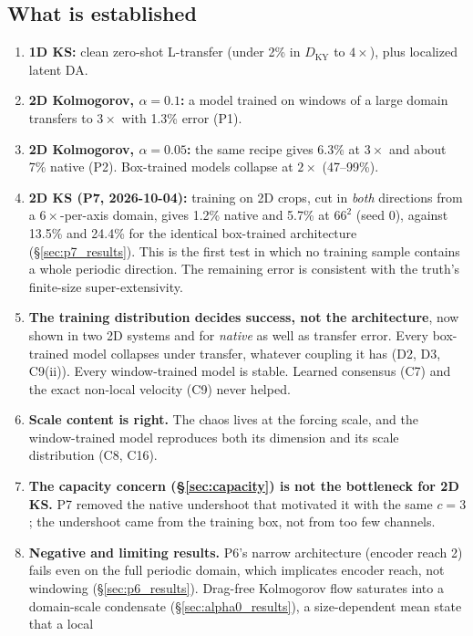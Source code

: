 \documentclass[11pt]{article}
\begin{document}
\subsection{What is established}
\begin{enumerate}[leftmargin=*]
\item \textbf{1D KS:} clean zero-shot L-transfer (under 2\% in
  $D_{\mathrm{KY}}$ to $4\times$), plus localized latent DA.
\item \textbf{2D Kolmogorov, $\alpha{=}0.1$:} a model trained on windows
  of a large domain transfers to $3\times$ with 1.3\% error (P1).
\item \textbf{2D Kolmogorov, $\alpha{=}0.05$:} the same recipe gives
  6.3\% at $3\times$ and about 7\% native (P2). Box-trained models
  collapse at $2\times$ (47--99\%).
\item \textbf{2D KS (P7, 2026-10-04):} training on 2D crops, cut in
  \emph{both} directions from a $6\times$-per-axis domain, gives 1.2\%
  native and 5.7\% at $66^2$ (seed 0), against 13.5\% and 24.4\% for
  the identical box-trained architecture (\S\ref{sec:p7_results}). This
  is the first test in which no training sample contains a whole
  periodic direction. The remaining error is consistent with the truth's
  finite-size super-extensivity.
\item \textbf{The training distribution decides success, not the
  architecture}, now shown in two 2D systems and for \emph{native} as
  well as transfer error. Every box-trained model collapses under transfer,
  whatever coupling it has (D2, D3, C9(ii)). Every window-trained model is
  stable. Learned consensus (C7) and the exact non-local velocity (C9)
  never helped.
\item \textbf{Scale content is right.} The chaos lives at the forcing
  scale, and the window-trained model reproduces both its dimension and
  its scale distribution (C8, C16).
\item \textbf{The capacity concern (\S\ref{sec:capacity}) is not the
  bottleneck for 2D KS.} P7 removed the native undershoot that motivated
  it with the same $c{=}3$; the undershoot came from the training box,
  not from too few channels.
\item \textbf{Negative and limiting results.} P6's narrow architecture
  (encoder reach 2) fails even on the full periodic domain, which
  implicates encoder reach, not windowing (\S\ref{sec:p6_results}). Drag-free
  Kolmogorov flow saturates into a domain-scale condensate
  (\S\ref{sec:alpha0_results}), a size-dependent mean state that a local

\end{enumerate}
\end{document}
